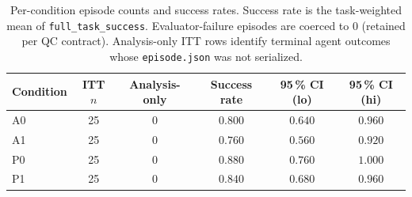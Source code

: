\begin{table}[ht]
\centering
\caption{Per-condition episode counts and success rates.
  Success rate is the task-weighted mean of \texttt{full\_task\_success}.
  Evaluator-failure episodes are coerced to 0 (retained per QC contract).
  Analysis-only ITT rows identify terminal agent outcomes whose
  \texttt{episode.json} was not serialized.}
\label{tab:condition_summary}
\begin{tabular}{lccccc}
\toprule
Condition & ITT $n$ & Analysis-only & Success rate & 95\,\% CI (lo) & 95\,\% CI (hi) \\
\midrule
  A0 & 25 & 0 & $0.800$ & $0.640$ & $0.960$ \\
  A1 & 25 & 0 & $0.760$ & $0.560$ & $0.920$ \\
  P0 & 25 & 0 & $0.880$ & $0.760$ & $1.000$ \\
  P1 & 25 & 0 & $0.840$ & $0.680$ & $0.960$ \\
\bottomrule
\end{tabular}
\end{table}
